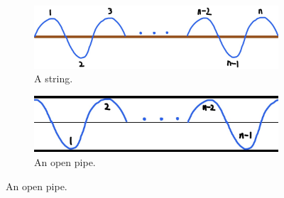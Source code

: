 \documentclass[oneside]{book}
\begin{document}
\begin{itemize}
\begin{table}[H]
        \label{table:overtones-and-harmonics}
    \end{table}
    \begin{figure}[H]
        \centering
        \begin{subfigure}[c]{0.5\textwidth}
            \centering
            \includegraphics[scale=0.13]{../images/StringStatWaves.jpg}
            \caption{A string.}
        \end{subfigure}%
        \begin{subfigure}[c]{0.5\textwidth}
            \centering
            \includegraphics[scale=0.155]{../images/Open Pipe.jpg}
            \caption{An open pipe.}
        \end{subfigure}%


\end{figure}
\end{itemize}
\end{document}
